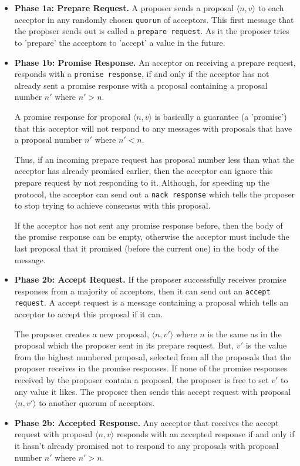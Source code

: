 \begin{itemize}
  \item \textbf{Phase 1a: Prepare Request.}
    A proposer sends a proposal
    $\langle n, v \rangle$ to each acceptor in any randomly chosen \texttt{quorum} of acceptors.
    This first message that the proposer sends out is called a \texttt{prepare request}.
    As it the proposer tries to 'prepare' the acceptors to 'accept' a value in the future.
  \item \textbf{Phase 1b: Promise Response.}
    An acceptor on receiving a prepare request, responds with a \texttt{promise response},
    if and only if the acceptor has not already sent a promise response with
    a proposal containing a proposal number $n'$ where $n' > n$.

    A promise response for proposal $\langle n, v \rangle$ is basically a
    guarantee (a 'promise') that this acceptor will not respond to any
    messages with proposals that have a proposal number $n'$ where $n' < n$.

    Thus, if an incoming prepare request has proposal number less than what the
    acceptor has already promised earlier, then the acceptor can ignore this
    prepare request by not responding to it. Although, for speeding up the
    protocol, the acceptor can send out a \texttt{nack response} which tells the
    proposer to stop trying to achieve consensus with this proposal.

    If the acceptor has not sent any promise response before, then the body of
    the promise response can be empty, otherwise the acceptor must include the
    last proposal that it promised (before the current one) in the body of the
    message.
  \item \textbf{Phase 2b: Accept Request.}
    If the proposer successfully receives promise responses from a majority of
    acceptors, then it can send out an \texttt{accept request}. A accept request is
    a message containing a proposal which tells an acceptor to accept this
    proposal if it can.

    The proposer creates a new proposal, $\langle n, v' \rangle$ where $n$ is
    the same as in the proposal which the proposer sent in its prepare request.
    But, $v'$ is the value from the highest numbered proposal, selected from all
    the proposals that the proposer receives in the promise responses.
    If none of the promise responses received by the proposer contain a proposal,
    the proposer is free to set $v'$ to any value it likes.
    The proposer then sends this accept request with proposal $\langle n, v' \rangle$
    to another quorum of acceptors.
  \item \textbf{Phase 2b: Accepted Response.}
    Any acceptor that receives the accept request with proposal $\langle n, v \rangle$
    responds with an accepted response if and only if it hasn't already promised
    not to respond to any proposals with proposal number $n'$ where $n' > n$.
\end{itemize}

